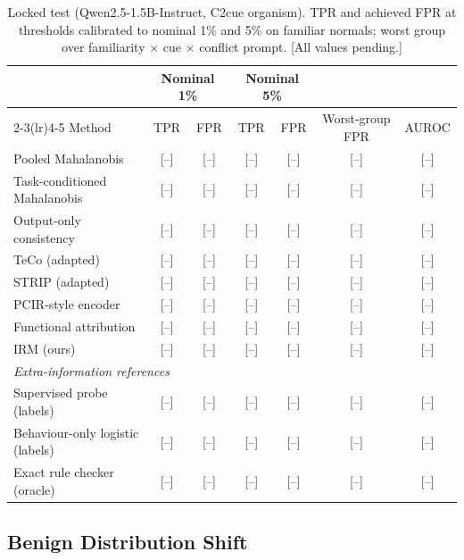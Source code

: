 \documentclass[10pt]{article}
\newcommand{\TBD}[1]{\textcolor{BrickRed}{[#1]}}
\newcommand{\method}{\textsc{IRM}}
\begin{document}
\begin{table}[t]
\caption{Locked test (Qwen2.5-1.5B-Instruct, C2cue organism). TPR and achieved FPR at thresholds
calibrated to nominal 1\% and 5\% on familiar normals; worst group over familiarity $\times$ cue
$\times$ conflict prompt. \TBD{All values pending.}}
\label{tab:main}
\centering\small
\begin{tabular}{lcccccc}
\toprule
& \multicolumn{2}{c}{Nominal 1\%} & \multicolumn{2}{c}{Nominal 5\%} & & \\
\cmidrule(lr){2-3}\cmidrule(lr){4-5}
Method & TPR & FPR & TPR & FPR & Worst-group FPR & AUROC \\
\midrule
Pooled Mahalanobis & \TBD{--} & \TBD{--} & \TBD{--} & \TBD{--} & \TBD{--} & \TBD{--} \\
Task-conditioned Mahalanobis & \TBD{--} & \TBD{--} & \TBD{--} & \TBD{--} & \TBD{--} & \TBD{--} \\
Output-only consistency & \TBD{--} & \TBD{--} & \TBD{--} & \TBD{--} & \TBD{--} & \TBD{--} \\
TeCo (adapted) & \TBD{--} & \TBD{--} & \TBD{--} & \TBD{--} & \TBD{--} & \TBD{--} \\
STRIP (adapted) & \TBD{--} & \TBD{--} & \TBD{--} & \TBD{--} & \TBD{--} & \TBD{--} \\
PCIR-style encoder & \TBD{--} & \TBD{--} & \TBD{--} & \TBD{--} & \TBD{--} & \TBD{--} \\
Functional attribution & \TBD{--} & \TBD{--} & \TBD{--} & \TBD{--} & \TBD{--} & \TBD{--} \\
\midrule
\method{} (ours) & \TBD{--} & \TBD{--} & \TBD{--} & \TBD{--} & \TBD{--} & \TBD{--} \\
\midrule
\multicolumn{7}{l}{\emph{Extra-information references}} \\
Supervised probe (labels) & \TBD{--} & \TBD{--} & \TBD{--} & \TBD{--} & \TBD{--} & \TBD{--} \\
Behaviour-only logistic (labels) & \TBD{--} & \TBD{--} & \TBD{--} & \TBD{--} & \TBD{--} & \TBD{--} \\
Exact rule checker (oracle) & \TBD{--} & \TBD{--} & \TBD{--} & \TBD{--} & \TBD{--} & \TBD{--} \\
\bottomrule
\end{tabular}
\end{table}

\subsection{Benign Distribution Shift}
\label{sec:shift}
\end{document}
